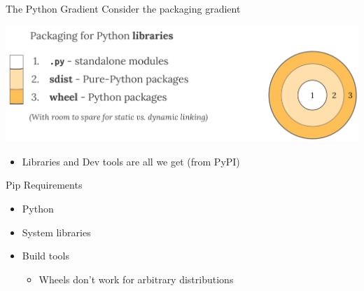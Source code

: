 \documentclass[bigger,unknownkeysallowed,aspectratio=169,red,colorblocks]{beamer}
\begin{document}
\begin{frame}[label={sec:orgf12e1dc}]{The Python Gradient}
Consider the packaging gradient\footnotemark
\begin{center}
\includegraphics[width=.9\linewidth]{images/The_Python_Gradient/2020-05-22_23-00-30_screenshot.png}
\end{center}
\begin{itemize}
\item Libraries and Dev tools are all we get (from PyPI)
\end{itemize}

\end{frame}
\begin{frame}[label={sec:org441c074}]{Pip Requirements}
\begin{itemize}
\item Python
\item System libraries
\item Build tools
\begin{itemize}
\item Wheels don't work for arbitrary distributions
\end{itemize}
\end{itemize}
\end{frame}
\end{document}
